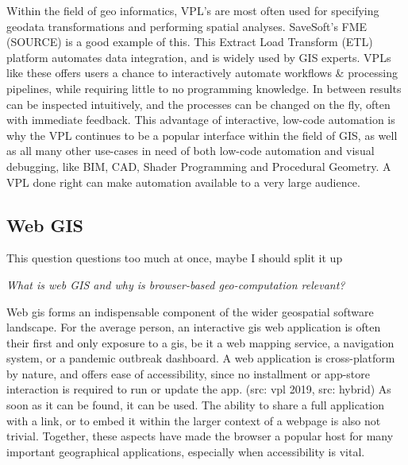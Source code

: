 Within the field of geo informatics, VPL's are most often used for specifying geodata transformations and performing spatial analyses.  
SaveSoft's FME (SOURCE) is a good example of this. This Extract Load Transform (ETL) platform automates data integration, and is widely used by GIS experts. 
VPLs like these offers users a chance to interactively automate workflows \& processing pipelines, while requiring little to no programming knowledge. 
In between results can be inspected intuitively, and the processes can be changed on the fly, often with immediate feedback.
This advantage of interactive, low-code automation is why the VPL continues to be a popular interface within the field of GIS, as well as all many other use-cases in need of both low-code automation and visual debugging, like BIM, CAD, Shader Programming and Procedural Geometry. 
A VPL done right can make automation available to a very large audience. 



\subsection*{Web GIS}

\begin{note}
  This question questions too much at once, maybe I should split it up  
\end{note}
\emph{What is web GIS and why is browser-based geo-computation relevant?}

Web \ac{gis} forms an indispensable component of the wider geospatial software landscape. 
For the average person, an interactive \ac{gis} web application is often their first and only exposure to a \acs{gis}, be it a web mapping service, a navigation system, or a pandemic outbreak dashboard. 
A web application is cross-platform by nature, and offers ease of accessibility, since no installment or app-store interaction is required to run or update the app. (src: vpl 2019, src: hybrid)
As soon as it can be found, it can be used.
The ability to share a full application with a link, or to embed it within the larger context of a webpage is also not trivial. 
Together, these aspects have made the browser a popular host for many important geographical applications, especially when accessibility is vital.

